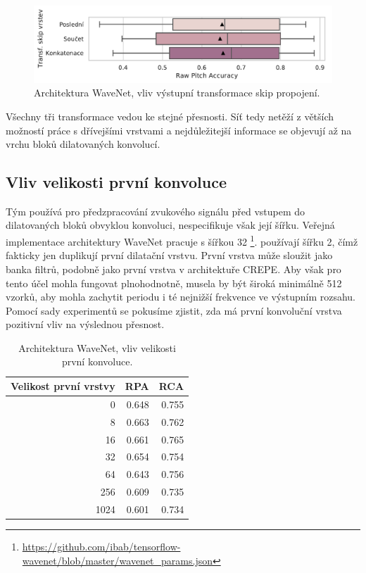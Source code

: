 \begin{figure}[h]\centering
    \includegraphics[scale=0.6]{../img/figures/wavenet_skip_reduction.pdf}
\caption{Architektura WaveNet, vliv výstupní transformace skip propojení.}\label{obr:wavenet_skip_reduction}
\end{figure}

Všechny tři transformace vedou ke stejné přesnosti. Síť tedy netěží z větších možností práce s dřívejšími vrstvami a nejdůležitejší informace se objevují až na vrchu bloků dilatovaných konvolucí.

\subsection{Vliv velikosti první konvoluce}

Tým \cite{Oord2016} používá pro předzpracování zvukového signálu před vstupem do dilatovaných bloků obvyklou konvoluci, nespecifikuje však její šířku. Veřejná implementace architektury WaveNet pracuje s šířkou 32 \footnote{\url{https://github.com/ibab/tensorflow-wavenet/blob/master/wavenet_params.json}}. \cite{Martak2018} používají šířku 2, čímž fakticky jen duplikují první dilatační vrstvu. První vrstva může sloužit jako banka filtrů, podobně jako první vrstva v architektuře CREPE. Aby však pro tento účel mohla fungovat plnohodnotně, musela by být široká minimálně 512 vzorků, aby mohla zachytit periodu i té nejnižší frekvence ve výstupním rozsahu. Pomocí sady experimentů se pokusíme zjistit, zda má první konvoluční vrstva pozitivní vliv na výslednou přesnost.


\begin{table}[h!]
\centering
    \begin{tabular}{rrr}
    \toprule
    Velikost první vrstvy &   RPA &   RCA \\
    \midrule
                        0 & 0.648 & 0.755 \\
                        8 & 0.663 & 0.762 \\
                    16 & 0.661 & 0.765 \\
                    32 & 0.654 & 0.754 \\
                    64 & 0.643 & 0.756 \\
                    256 & 0.609 & 0.735 \\
                    1024 & 0.601 & 0.734 \\
    \bottomrule
    \end{tabular}
\caption{Architektura WaveNet, vliv velikosti první konvoluce.}\label{tab:wavenet_first_layer}
\end{table}

